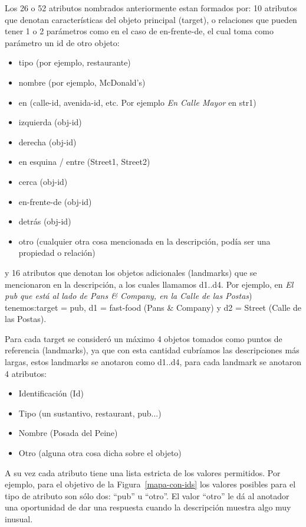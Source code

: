 Los 26 o 52 atributos nombrados anteriormente estan formados por:
10 atributos que denotan caracter\'isticas del objeto principal (target), o relaciones que pueden tener 1 o 2 par\'ametros como en el caso de en-frente-de, el cual toma como par\'ametro un id de otro objeto:
\begin{itemize}
  \item tipo (por ejemplo, restaurante)
  \item nombre (por ejemplo, McDonald's)
  \item en (calle-id, avenida-id, etc. Por ejemplo {\it En Calle Mayor} en str1)
  \item izquierda (obj-id)
  \item derecha (obj-id)
  \item en esquina / entre (Street1, Street2)
  \item cerca (obj-id)
  \item en-frente-de (obj-id)
  \item detr\'as (obj-id)
  \item otro (cualquier otra cosa mencionada en la descripci\'on, pod\'ia ser una propiedad o relaci\'on)
\end{itemize}
y 16 atributos que denotan los objetos adicionales (landmarks) que se mencionaron en la descripci\'on, a los cuales llamamos d1..d4. Por ejemplo, en {\it El pub que est\'a al lado de Pans \& Company, en la Calle de las Postas}) tenemos:target = pub, d1 = fast-food (Pans \& Company) y d2 = Street (Calle de las Postas).

Para cada target se consider\'o un m\'aximo 4 objetos tomados como puntos de referencia (landmarks), ya que con esta cantidad cubr\'iamos las descripciones m\'as largas, estos landmarks se anotaron como d1..d4, para cada landmark se anotaron 4 atributos:
\begin{itemize}
  \item Identificaci\'on (Id)
  \item Tipo (un sustantivo, restaurant, pub...)
  \item Nombre (Posada del Peine)
  \item Otro (alguna otra cosa dicha sobre el objeto)
\end{itemize}

A su vez cada atributo tiene una lista estricta de los valores permitidos. Por ejemplo, para el objetivo de la Figura~\ref{mapa-con-ids} los valores posibles para el tipo de atributo son s\'olo dos: ``pub'' u ``otro''. El valor ``otro'' le d\'a al anotador una oportunidad de dar una respuesta cuando la descripci\'on muestra algo muy inusual.

